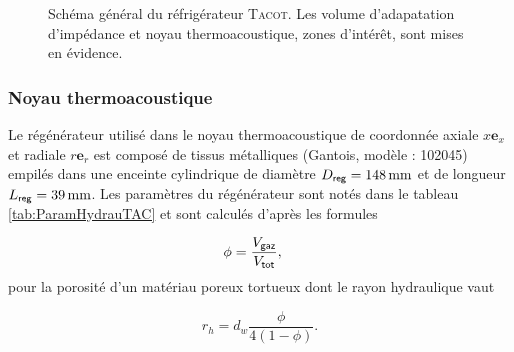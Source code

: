 \begin{figure}[!ht]
    \centering
    
    \caption[Schéma général du réfrigérateur \textsc{Tacot} et mise en évidence des zones d'intérêt pour cette thèse]{Schéma général du réfrigérateur \textsc{Tacot}. Les \colorbox{MatlabYellow}{volume d'adapatation d'impédance} et \colorbox{MatlabOrange}{noyau thermoacoustique}, zones d'intérêt, sont mises en évidence.}
    \label{fig:SchemaGeneralTACOT}
\end{figure}



\subsubsection{Noyau thermoacoustique}

Le régénérateur utilisé dans le noyau thermoacoustique de coordonnée axiale $x \mathbf e_x$ et radiale $r \mathbf e_r$ est composé de tissus métalliques (Gantois, modèle : 102045) empilés dans une enceinte cylindrique de diamètre $D_{\sf reg}=\qty{148}{\mm}$ et de longueur $L_{\sf reg}=\qty{39}{\mm}$. Les paramètres du régénérateur sont notés dans le tableau \ref{tab:ParamHydrauTAC} et sont calculés d'après les formules 

\begin{align}
	\phi &= \frac{V_{\sf gaz}}{V_{\sf tot}}, \label{eq:Porosite_Volume}%
\end{align}
pour la porosité d'un matériau poreux tortueux dont le rayon hydraulique vaut 

\begin{equation}
	r_h = d_w\frac{\phi}{4(1-\phi)}.
	\label{eq:DefRayonHydrauGantois}
\end{equation}

